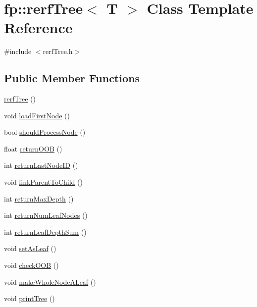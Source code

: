 \hypertarget{classfp_1_1rerfTree}{}\section{fp\+:\+:rerf\+Tree$<$ T $>$ Class Template Reference}
\label{classfp_1_1rerfTree}


{\ttfamily \#include $<$rerf\+Tree.\+h$>$}

\subsection*{Public Member Functions}
\begin{DoxyCompactItemize}
\item 
\hyperlink{classfp_1_1rerfTree_a74790abf9a1287184e1874623a3e97bf}{rerf\+Tree} ()
\item 
void \hyperlink{classfp_1_1rerfTree_a00b09f0d455acaae7ae2d11db5d82478}{load\+First\+Node} ()
\item 
bool \hyperlink{classfp_1_1rerfTree_ae8c63628698cd29fb24cfecf0c2e302e}{should\+Process\+Node} ()
\item 
float \hyperlink{classfp_1_1rerfTree_aafda414eef799af60a01fb2a45cc81f8}{return\+O\+OB} ()
\item 
int \hyperlink{classfp_1_1rerfTree_a99ed99d742ffd7f6f38487434a14b9ff}{return\+Last\+Node\+ID} ()
\item 
void \hyperlink{classfp_1_1rerfTree_a7750b048cb8beaada5279f3a702f6cc2}{link\+Parent\+To\+Child} ()
\item 
int \hyperlink{classfp_1_1rerfTree_ac46ff8e95b8154fc3bfc492f4eb1c1c5}{return\+Max\+Depth} ()
\item 
int \hyperlink{classfp_1_1rerfTree_ad5ff10663021ec1abfd6cc0dfb7f9408}{return\+Num\+Leaf\+Nodes} ()
\item 
int \hyperlink{classfp_1_1rerfTree_a206939d3e501ed273f07c211fa57e997}{return\+Leaf\+Depth\+Sum} ()
\item 
void \hyperlink{classfp_1_1rerfTree_a85c0f3ee590d5cd8524b0a7e80cffcaf}{set\+As\+Leaf} ()
\item 
void \hyperlink{classfp_1_1rerfTree_a57086b38168e07aaf9cd9e9f1842058d}{check\+O\+OB} ()
\item 
void \hyperlink{classfp_1_1rerfTree_a2cc428162305a46d79268addda902688}{make\+Whole\+Node\+A\+Leaf} ()
\item 
void \hyperlink{classfp_1_1rerfTree_a25a1fa35e8ad02bfb1d390679152e798}{print\+Tree} ()
\item 

\end{DoxyCompactItemize}
